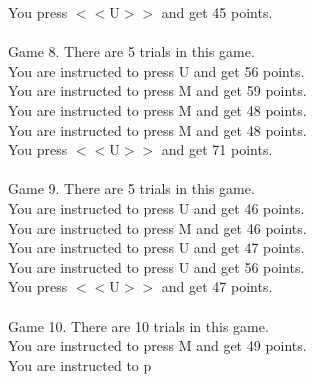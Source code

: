 \documentclass[pdflatex,sn-nature]{sn-jnl}%
\theoremstyle{thmstyleone}%
\theoremstyle{thmstyletwo}%
\theoremstyle{thmstylethree}%
\begin{document}
You press $<<$U$>>$ and get 45 points. $~$\\ 
 $~$\\ 
Game 8. There are 5 trials in this game. $~$\\ 
You are instructed to press U and get 56 points. $~$\\ 
You are instructed to press M and get 59 points. $~$\\ 
You are instructed to press M and get 48 points. $~$\\ 
You are instructed to press M and get 48 points. $~$\\ 
You press $<<$U$>>$ and get 71 points. $~$\\ 
 $~$\\ 
Game 9. There are 5 trials in this game. $~$\\ 
You are instructed to press U and get 46 points. $~$\\ 
You are instructed to press M and get 46 points. $~$\\ 
You are instructed to press U and get 47 points. $~$\\ 
You are instructed to press U and get 56 points. $~$\\ 
You press $<<$U$>>$ and get 47 points. $~$\\ 
 $~$\\ 
Game 10. There are 10 trials in this game. $~$\\ 
You are instructed to press M and get 49 points. $~$\\ 
You are instructed to p 
\end{document}
